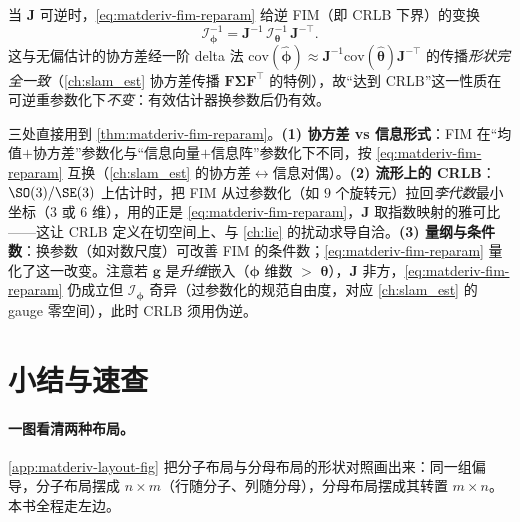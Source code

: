 \begin{corollary}\label{cor:matderiv-crlb-reparam}
当 $\mathbf{J}$ 可逆时，\cref{eq:matderiv-fim-reparam} 给逆 FIM（即 CRLB 下界）的变换
\begin{equation}
  \boldsymbol{\mathcal{I}}_{\boldsymbol{\phi}}^{-1}=\mathbf{J}^{-1}\,\boldsymbol{\mathcal{I}}_{\boldsymbol{\theta}}^{-1}\,\mathbf{J}^{-\top}.
  \label{eq:matderiv-crlb-reparam}
\end{equation}
这与无偏估计的协方差经一阶 delta 法 $\mathrm{cov}(\hat{\boldsymbol{\phi}})\approx\mathbf{J}^{-1}\mathrm{cov}(\hat{\boldsymbol{\theta}})\mathbf{J}^{-\top}$ 的传播\emph{形状完全一致}（\cref{ch:slam_est} 协方差传播 $\mathbf{F}\boldsymbol{\Sigma}\mathbf{F}^\top$ 的特例），故“达到 CRLB”这一性质在可逆重参数化下\emph{不变}：有效估计器换参数后仍有效。
\end{corollary}

\begin{insight}[为什么本书关心这件事]
三处直接用到 \cref{thm:matderiv-fim-reparam}。\textbf{(1) 协方差 vs 信息形式}：FIM 在“均值$+$协方差”参数化与“信息向量$+$信息阵”参数化下不同，按 \cref{eq:matderiv-fim-reparam} 互换（\cref{ch:slam_est} 的协方差$\leftrightarrow$信息对偶）。\textbf{(2) 流形上的 CRLB}：$\SO(3)/\SE(3)$ 上估计时，把 FIM 从过参数化（如 $9$ 个旋转元）拉回\emph{李代数}最小坐标（$3$ 或 $6$ 维），用的正是 \cref{eq:matderiv-fim-reparam}，$\mathbf{J}$ 取指数映射的雅可比——这让 CRLB 定义在切空间上、与 \cref{ch:lie} 的扰动求导自洽。\textbf{(3) 量纲与条件数}：换参数（如对数尺度）可改善 FIM 的条件数；\cref{eq:matderiv-fim-reparam} 量化了这一改变。注意若 $\mathbf{g}$ 是\emph{升维}嵌入（$\boldsymbol{\phi}$ 维数 $>$ $\boldsymbol{\theta}$），$\mathbf{J}$ 非方，\cref{eq:matderiv-fim-reparam} 仍成立但 $\boldsymbol{\mathcal{I}}_{\boldsymbol{\phi}}$ 奇异（过参数化的规范自由度，对应 \cref{ch:slam_est} 的 gauge 零空间），此时 CRLB 须用伪逆。
\end{insight}

\section{小结与速查}
\label{sec:matderiv-summary}

\paragraph{一图看清两种布局。}
\cref{app:matderiv-layout-fig} 把分子布局与分母布局的形状对照画出来：同一组偏导，分子布局摆成 $n\times m$（行随分子、列随分母），分母布局摆成其转置 $m\times n$。本书全程走左边。

